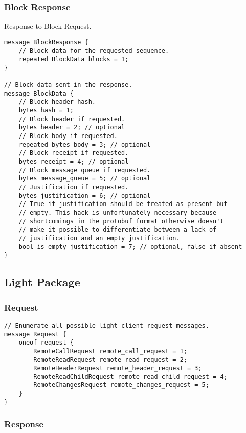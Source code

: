 \documentclass{book}
\begin{document}
\subsubsection{Block Response}

Response to Block Request.

\begin{lstlisting}[frame=single]
message BlockResponse {
    // Block data for the requested sequence.
    repeated BlockData blocks = 1;
} 

// Block data sent in the response.
message BlockData {
    // Block header hash.
    bytes hash = 1;
    // Block header if requested.
    bytes header = 2; // optional
    // Block body if requested.
    repeated bytes body = 3; // optional
    // Block receipt if requested.
    bytes receipt = 4; // optional
    // Block message queue if requested.
    bytes message_queue = 5; // optional
    // Justification if requested.
    bytes justification = 6; // optional
    // True if justification should be treated as present but
    // empty. This hack is unfortunately necessary because 
    // shortcomings in the protobuf format otherwise doesn't
    // make it possible to differentiate between a lack of 
    // justification and an empty justification.
    bool is_empty_justification = 7; // optional, false if absent
}
\end{lstlisting}

\subsection{Light Package}

\subsubsection{Request}

\begin{lstlisting}[frame=single]
// Enumerate all possible light client request messages.
message Request {
	oneof request {
		RemoteCallRequest remote_call_request = 1;
		RemoteReadRequest remote_read_request = 2;
		RemoteHeaderRequest remote_header_request = 3;
		RemoteReadChildRequest remote_read_child_request = 4;
		RemoteChangesRequest remote_changes_request = 5;
	}
}
\end{lstlisting}

\subsubsection{Response}
\end{document}
